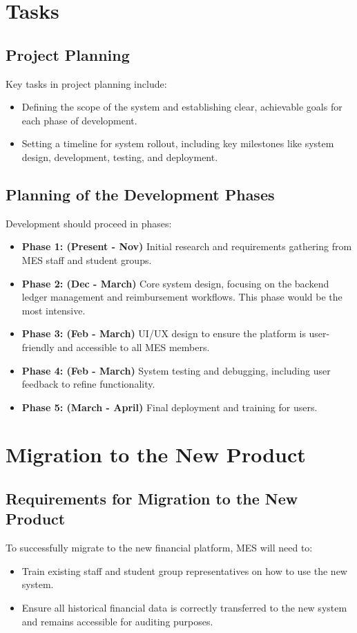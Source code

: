 \documentclass[12pt]{article}
\begin{document}
\section{Tasks}
\subsection{Project Planning}
Key tasks in project planning include:
\begin{itemize}
    \item Defining the scope of the system and establishing clear, achievable goals for each phase of development.
    \item Setting a timeline for system rollout, including key milestones like system design, development, testing, and deployment.
\end{itemize}

\subsection{Planning of the Development Phases}
Development should proceed in phases:
\begin{itemize}
    \item \textbf{Phase 1: (Present - Nov)} Initial research and requirements gathering from MES staff and student groups. 
    \item \textbf{Phase 2: (Dec - March)} Core system design, focusing on the backend ledger management and reimbursement workflows. This phase would be the most intensive.
    \item \textbf{Phase 3: (Feb - March) } UI/UX design to ensure the platform is user-friendly and accessible to all MES members.
    \item \textbf{Phase 4: (Feb - March)} System testing and debugging, including user feedback to refine functionality.
    \item \textbf{Phase 5: (March - April)} Final deployment and training for users.
\end{itemize}

\section{Migration to the New Product}
\subsection{Requirements for Migration to the New Product}
To successfully migrate to the new financial platform, MES will need to:
\begin{itemize}
    \item Train existing staff and student group representatives on how to use the new system.
    \item Ensure all historical financial data is correctly transferred to the new system and remains accessible for auditing purposes.
\end{itemize}
\end{document}
